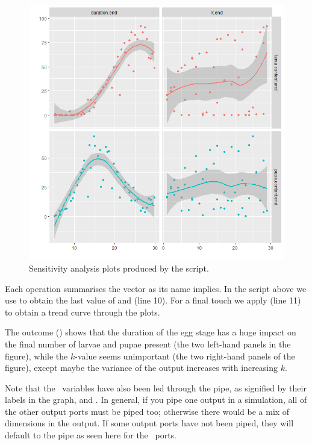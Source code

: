 \begin{figure} 
\centering
\includegraphics[scale=0.5]{graphics/sensitivity3}
\caption{Sensitivity analysis plots produced by the  script.}
\label{fig:sensitivity3}
\end{figure}

Each operation summarises the vector as its name implies. In the script above we use  to obtain the last value of  and  (line 10). For a final touch we apply  (line 11) to obtain a trend curve through the plots.
                          
The outcome () shows that the duration of the egg stage has a huge impact on the final number of larvae and pupae present (the two left-hand panels in the figure), while the $k$-value seems unimportant (the two right-hand panels of the figure), except maybe the variance of the output increases with increasing $k$.

Note that the \xaxis\ variables have also been led through the  pipe, as signified by their labels in the graph,  and . In general, if you pipe one output in a simulation, all of the other output ports must be piped too; otherwise there would be a mix of dimensions in the output. If some output ports have not been piped, they will default to the  pipe as seen here for the \xaxis\ ports. 

